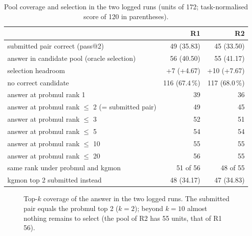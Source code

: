 \documentclass[11pt]{article}
\newcommand{\R}[1]{R#1}
\begin{document}
\begin{table}[t]
\centering
\caption{Pool coverage and selection in the two logged runs (units of 172; task-normalised score of 120 in parentheses).}
\label{tab:pool}
\begin{tabular}{lrr}
\toprule
 & \R{1} & \R{2} \\
\midrule
submitted pair correct (pass@2) & 49 (35.83) & 45 (33.50) \\
answer in candidate pool (oracle selection) & 56 (40.50) & 55 (41.17) \\
selection headroom & +7 (+4.67) & +10 (+7.67) \\
no correct candidate & 116 (67.4\,\%) & 117 (68.0\,\%) \\
\midrule
answer at probmul rank 1 & 39 & 36 \\
answer at probmul rank $\le$ 2 (= submitted pair) & 49 & 45 \\
answer at probmul rank $\le$ 3 & 52 & 51 \\
answer at probmul rank $\le$ 5 & 54 & 54 \\
answer at probmul rank $\le$ 10 & 55 & 55 \\
answer at probmul rank $\le$ 20 & 56 & 55 \\
same rank under probmul and kgmon & 51 of 56 & 48 of 55 \\
kgmon top 2 submitted instead & 48 (34.17) & 47 (34.83) \\
\bottomrule
\end{tabular}
\end{table}

\begin{figure}[t]
\centering
{}
\caption{Top-$k$ coverage of the answer in the two logged runs. The submitted pair equals the probmul top 2 ($k=2$); beyond $k=10$ almost nothing remains to select (the pool of \R{2} has 55 units, that of \R{1} 56).}
\label{fig:topk}
\end{figure}
\end{document}
